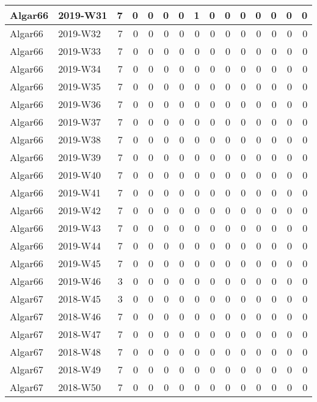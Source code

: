\documentclass[]{book}
\begin{document}
\begin{table}
\begin{tabular}[t]{l|l|r|r|r|r|r|r|r|r|r|r|r|r|r}
\hline
Algar66 & 2019-W31 & 7 & 0 & 0 & 0 & 0 & 1 & 0 & 0 & 0 & 0 & 0 & 0 & 0\\
\hline
Algar66 & 2019-W32 & 7 & 0 & 0 & 0 & 0 & 0 & 0 & 0 & 0 & 0 & 0 & 0 & 0\\
\hline
Algar66 & 2019-W33 & 7 & 0 & 0 & 0 & 0 & 0 & 0 & 0 & 0 & 0 & 0 & 0 & 0\\
\hline
Algar66 & 2019-W34 & 7 & 0 & 0 & 0 & 0 & 0 & 0 & 0 & 0 & 0 & 0 & 0 & 0\\
\hline
Algar66 & 2019-W35 & 7 & 0 & 0 & 0 & 0 & 0 & 0 & 0 & 0 & 0 & 0 & 0 & 0\\
\hline
Algar66 & 2019-W36 & 7 & 0 & 0 & 0 & 0 & 0 & 0 & 0 & 0 & 0 & 0 & 0 & 0\\
\hline
Algar66 & 2019-W37 & 7 & 0 & 0 & 0 & 0 & 0 & 0 & 0 & 0 & 0 & 0 & 0 & 0\\
\hline
Algar66 & 2019-W38 & 7 & 0 & 0 & 0 & 0 & 0 & 0 & 0 & 0 & 0 & 0 & 0 & 0\\
\hline
Algar66 & 2019-W39 & 7 & 0 & 0 & 0 & 0 & 0 & 0 & 0 & 0 & 0 & 0 & 0 & 0\\
\hline
Algar66 & 2019-W40 & 7 & 0 & 0 & 0 & 0 & 0 & 0 & 0 & 0 & 0 & 0 & 0 & 0\\
\hline
Algar66 & 2019-W41 & 7 & 0 & 0 & 0 & 0 & 0 & 0 & 0 & 0 & 0 & 0 & 0 & 0\\
\hline
Algar66 & 2019-W42 & 7 & 0 & 0 & 0 & 0 & 0 & 0 & 0 & 0 & 0 & 0 & 0 & 0\\
\hline
Algar66 & 2019-W43 & 7 & 0 & 0 & 0 & 0 & 0 & 0 & 0 & 0 & 0 & 0 & 0 & 0\\
\hline
Algar66 & 2019-W44 & 7 & 0 & 0 & 0 & 0 & 0 & 0 & 0 & 0 & 0 & 0 & 0 & 0\\
\hline
Algar66 & 2019-W45 & 7 & 0 & 0 & 0 & 0 & 0 & 0 & 0 & 0 & 0 & 0 & 0 & 0\\
\hline
Algar66 & 2019-W46 & 3 & 0 & 0 & 0 & 0 & 0 & 0 & 0 & 0 & 0 & 0 & 0 & 0\\
\hline
Algar67 & 2018-W45 & 3 & 0 & 0 & 0 & 0 & 0 & 0 & 0 & 0 & 0 & 0 & 0 & 0\\
\hline
Algar67 & 2018-W46 & 7 & 0 & 0 & 0 & 0 & 0 & 0 & 0 & 0 & 0 & 0 & 0 & 0\\
\hline
Algar67 & 2018-W47 & 7 & 0 & 0 & 0 & 0 & 0 & 0 & 0 & 0 & 0 & 0 & 0 & 0\\
\hline
Algar67 & 2018-W48 & 7 & 0 & 0 & 0 & 0 & 0 & 0 & 0 & 0 & 0 & 0 & 0 & 0\\
\hline
Algar67 & 2018-W49 & 7 & 0 & 0 & 0 & 0 & 0 & 0 & 0 & 0 & 0 & 0 & 0 & 0\\
\hline
Algar67 & 2018-W50 & 7 & 0 & 0 & 0 & 0 & 0 & 0 & 0 & 0 & 0 & 0 & 0 & 0\\

\end{tabular}
\end{table}
\end{document}
